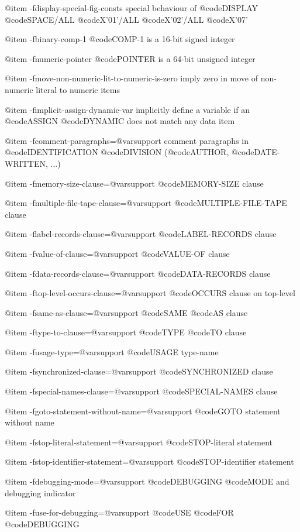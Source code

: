 @item -fdisplay-special-fig-consts
special behaviour of @code{DISPLAY} @code{SPACE/ALL} @code{X'01'/ALL} @code{X'02'/ALL} @code{X'07'}

@item -fbinary-comp-1
@code{COMP-1} is a 16-bit signed integer

@item -fnumeric-pointer
@code{POINTER} is a 64-bit unsigned integer

@item -fmove-non-numeric-lit-to-numeric-is-zero
imply zero in move of non-numeric literal to numeric items

@item -fimplicit-assign-dynamic-var
implicitly define a variable if an @code{ASSIGN} @code{DYNAMIC} does not match any data item

@item -fcomment-paragraphs=@var{support}
comment paragraphs in @code{IDENTIFICATION} @code{DIVISION} (@code{AUTHOR}, @code{DATE-WRITTEN}, ...)

@item -fmemory-size-clause=@var{support}
@code{MEMORY-SIZE} clause

@item -fmultiple-file-tape-clause=@var{support}
@code{MULTIPLE-FILE-TAPE} clause

@item -flabel-records-clause=@var{support}
@code{LABEL-RECORDS} clause

@item -fvalue-of-clause=@var{support}
@code{VALUE-OF} clause

@item -fdata-records-clause=@var{support}
@code{DATA-RECORDS} clause

@item -ftop-level-occurs-clause=@var{support}
@code{OCCURS} clause on top-level

@item -fsame-as-clause=@var{support}
@code{SAME} @code{AS} clause

@item -ftype-to-clause=@var{support}
@code{TYPE} @code{TO} clause

@item -fusage-type=@var{support}
@code{USAGE} type-name

@item -fsynchronized-clause=@var{support}
@code{SYNCHRONIZED} clause

@item -fspecial-names-clause=@var{support}
@code{SPECIAL-NAMES} clause

@item -fgoto-statement-without-name=@var{support}
@code{GOTO} statement without name

@item -fstop-literal-statement=@var{support}
@code{STOP}-literal statement

@item -fstop-identifier-statement=@var{support}
@code{STOP}-identifier statement

@item -fdebugging-mode=@var{support}
@code{DEBUGGING} @code{MODE} and debugging indicator

@item -fuse-for-debugging=@var{support}
@code{USE} @code{FOR} @code{DEBUGGING}

